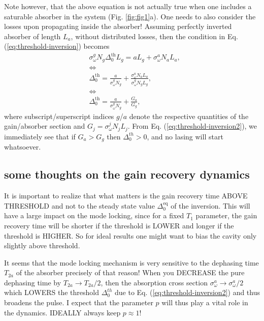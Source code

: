 \documentclass[preprint,secnumarabic,amssymb, nobibnotes, aip, prd]{revtex4-1}
\begin{document}
Note however, that the above equation is not actually true when one includes a saturable absorber in the system (Fig. \ref{fig:fig1}a). One needs to also consider the losses upon propagating inside the absorber! Assuming perfectly inverted absorber of length $L_a$, without distributed losses, then the condition in Eq. (\ref{eq:threshold-inversion}) becomes
\begin{align}
\label{eq:threshold-inversion2}
&\sigma_{\omega}^{g}N_g\Delta_0^{\text{th}}L_g = aL_g+ \sigma_{\omega}^a N_a L_a, \nonumber \\
& \Leftrightarrow \nonumber \\
&\Delta_0^{\text{th}} = \frac{a}{\sigma_{\omega}^{g}N_g} + \frac{\sigma_{\omega}^{a}N_a L_a}{\sigma_{\omega}^{g}N_g L_g}, \nonumber \\
& \Leftrightarrow \nonumber \\
&\Delta_0^{\text{th}} = \frac{a}{\sigma_{\omega}^{g}N_g} +  \frac{G_a}{G_g},
\end{align}
where subscript/superscript indices $g$/$a$ denote the respective quantities of the gain/absorber section and $G_j = \sigma_{\omega}^{j}N_j L_j$. From Eq. (\ref{eq:threshold-inversion2}), we immediately see that 
if $G_a>G_g$ then $\Delta_0^{th} > 0$, and no lasing will start whatsoever. 

\subsection{some thoughts on the gain recovery dynamics}
	It is important to realize that what matters is the gain recovery time ABOVE THRESHOLD and not to the steady state value $\Delta_0^{\text{eq}}$ of the inversion. This will have a large impact on the mode locking, since for a fixed $T_1$ parameter, the gain recovery time will be shorter if the threshold is LOWER and longer if the threshold is HIGHER. So for ideal results one might want to bias the cavity only slightly above threshold.

	It seems that the mode locking mechanism is very sensitive to the dephasing time $T_{2a}$ of the absorber precisely of that reason! When you DECREASE the pure dephasing time by $T_{2a}\rightarrow T_{2a}/2$, then the absorption cross section $\sigma_\omega^{a} \rightarrow \sigma_\omega^{a}/2$ which LOWERS the threshold $\Delta_{0}^{th}$ due to Eq. (\ref{eq:threshold-inversion2}) and thus broadens the pulse. I expect that the parameter $p$ will thus play a vital role in the dynamics. IDEALLY always keep $p \approx 1$!  
\end{document}
